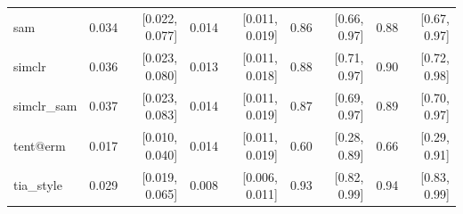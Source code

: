 \begin{tabular}{lrrrrrrrr}
sam & 0.034 & [0.022, 0.077] & 0.014 & [0.011, 0.019] & 0.86 & [0.66, 0.97] & 0.88 & [0.67, 0.97] \\
simclr & 0.036 & [0.023, 0.080] & 0.013 & [0.011, 0.018] & 0.88 & [0.71, 0.97] & 0.90 & [0.72, 0.98] \\
simclr\_sam & 0.037 & [0.023, 0.083] & 0.014 & [0.011, 0.019] & 0.87 & [0.69, 0.97] & 0.89 & [0.70, 0.97] \\
tent@erm & 0.017 & [0.010, 0.040] & 0.014 & [0.011, 0.019] & 0.60 & [0.28, 0.89] & 0.66 & [0.29, 0.91] \\
tia\_style & 0.029 & [0.019, 0.065] & 0.008 & [0.006, 0.011] & 0.93 & [0.82, 0.99] & 0.94 & [0.83, 0.99] \\
\bottomrule
\end{tabular}
